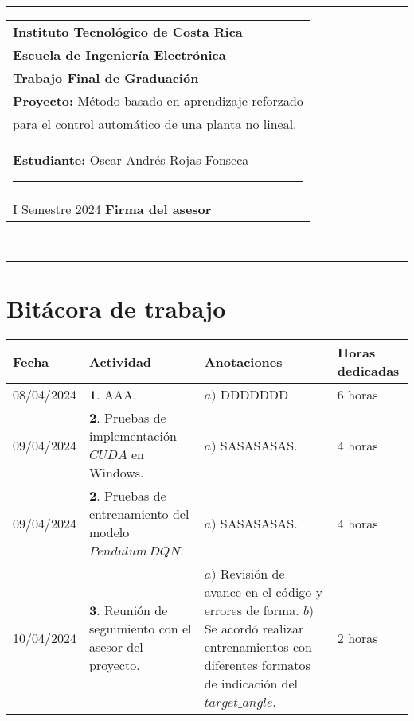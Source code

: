 \documentclass[12pt]{article}
\begin{document}
\hfill\\
\rule{\textwidth}{1.5pt}

\begin{minipage}[t]{85mm}
  \begin{tabular}{l}
    \textbf{\large Instituto Tecnológico de Costa Rica} \\  
    \textbf{Escuela de Ingeniería Electrónica} \\
    \textbf{Trabajo Final de Graduación} \\
    \textbf{Proyecto:} Método basado en aprendizaje reforzado \\para el control automático de una planta no lineal. \\
    \textbf{Estudiante:} Oscar Andrés Rojas Fonseca \hspace{3cm}\rule{4.5cm}{1.5pt}\\
    I Semestre 2024 \hspace{8.5cm}\textbf{Firma del asesor}
  \end{tabular}
\end{minipage}
\hfill\\
\rule{\textwidth}{1.5pt}


\section*{Bitácora de trabajo}

\begin{minipage}[h]{\textwidth}
	\centering
	\begin{tabularx}{\textwidth}{|p{2cm}|X|X|p{2cm}|} 
		\hline
		\rowcolor{encabezado}
		\textbf{Fecha} & 
		\textbf{Actividad} & 
		\textbf{Anotaciones} & 
		\textbf{Horas dedicadas} \\ \hline
	 	08/04/2024 & 
	 	$\mathbf{1}.$ AAA. & 
	 	$a)$ DDDDDDD \newline & 
	 	6 horas \\
		09/04/2024 & 
	 	$\mathbf{2}.$ Pruebas de implementación $CUDA$ en Windows. &
	 	$a)$ SASASASAS. \newline & 
	 	4 horas \\
		09/04/2024 & 
	 	$\mathbf{2}.$ Pruebas de entrenamiento del modelo $Pendulum\, DQN$. &
	 	$a)$ SASASASAS. \newline & 
	 	4 horas \\
	 	10/04/2024 & 
	 	$\mathbf{3}.$ Reunión de seguimiento con el asesor del proyecto. & 
	 	$a)$ Revisión de avance en el código y errores de forma.  \newline
	 	$b)$ Se acordó realizar entrenamientos con diferentes formatos de indicación del $target\_angle$.  \newline & 
	 	2 horas \\
	 	\hline
	\end{tabularx}
\end{minipage}	 	
	 	
\end{document}
